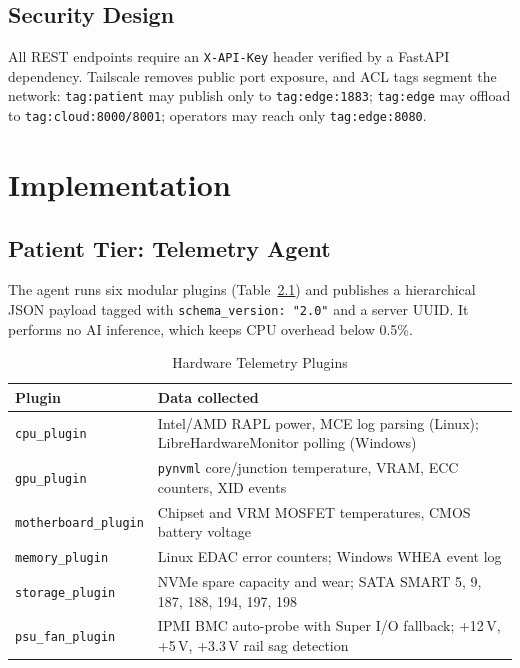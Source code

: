 \documentclass[12pt,a4paper]{report}
\begin{document}
\section{Security Design}
All REST endpoints require an \texttt{X-API-Key} header verified by a FastAPI dependency. Tailscale removes public port exposure, and ACL tags segment the network: \texttt{tag:patient} may publish only to \texttt{tag:edge:1883}; \texttt{tag:edge} may offload to \texttt{tag:cloud:8000/8001}; operators may reach only \texttt{tag:edge:8080}.
\clearpage

\chapter{Implementation}

\section{Patient Tier: Telemetry Agent}
The agent runs six modular plugins (Table~\ref{tab:plugins}) and publishes a hierarchical JSON payload tagged with \texttt{schema\_version: "2.0"} and a server UUID. It performs no AI inference, which keeps CPU overhead below 0.5\%.

\begin{table}[h!]
  \centering
  \caption{Hardware Telemetry Plugins}
  \label{tab:plugins}
  \vspace*{5pt}
  \footnotesize
  \renewcommand{\arraystretch}{1.4}
  \begin{tabular}{|p{3.3cm}|p{9.5cm}|}
    \hline
    \textbf{Plugin} & \textbf{Data collected} \\ \hline
    \texttt{cpu\_plugin} & Intel/AMD RAPL power, MCE log parsing (Linux); LibreHardwareMonitor polling (Windows) \\ \hline
    \texttt{gpu\_plugin} & \texttt{pynvml} core/junction temperature, VRAM, ECC counters, XID events \\ \hline
    \texttt{motherboard\_plugin} & Chipset and VRM MOSFET temperatures, CMOS battery voltage \\ \hline
    \texttt{memory\_plugin} & Linux EDAC error counters; Windows WHEA event log \\ \hline
    \texttt{storage\_plugin} & NVMe spare capacity and wear; SATA SMART 5, 9, 187, 188, 194, 197, 198 \\ \hline
    \texttt{psu\_fan\_plugin} & IPMI BMC auto-probe with Super I/O fallback; +12\,V, +5\,V, +3.3\,V rail sag detection \\ \hline
  \end{tabular}
\end{table}
\end{document}
